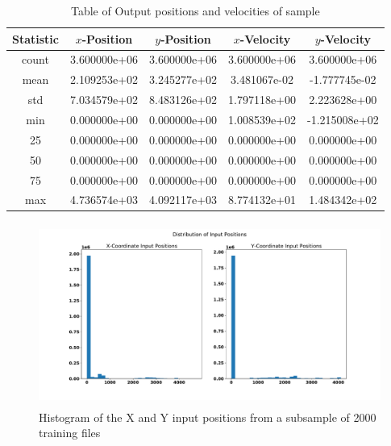 \documentclass{article}
\begin{document}
    \begin{table}[h!]
        \centering
        \begin{tabular}{|| c | c c c c||} 
        \hline
        Statistic & $x$-Position & $y$-Position & $x$-Velocity & $y$-Velocity\\ [0.5ex] 
        \hline\hline
        count & 3.600000e+06 & 3.600000e+06 & 3.600000e+06 & 3.600000e+06\\
        mean & 2.109253e+02 & 3.245277e+02 & 3.481067e-02 & -1.777745e-02\\
        std & 7.034579e+02 & 8.483126e+02 & 1.797118e+00 & 2.223628e+00\\
        min & 0.000000e+00 & 0.000000e+00  & 1.008539e+02 & -1.215008e+02\\
        25 & 	0.000000e+00 & 0.000000e+00 & 0.000000e+00 & 0.000000e+00\\
        50 & 	0.000000e+00 & 0.000000e+00 & 0.000000e+00 & 0.000000e+00\\
        75 & 	0.000000e+00 & 0.000000e+00 & 0.000000e+00 & 0.000000e+00\\
        max & 4.736574e+03 & 4.092117e+03 & 8.774132e+01 & 1.484342e+02\\
        \hline
        \end{tabular}
        \caption{Table of Output positions and velocities of sample}
        \label{table:2}
    \end{table}

    \begin{figure}[H]
        \centering
        \includegraphics[height=6cm]{figures/sample-in-position-hist.pdf}%
        \caption{Histogram of the X and Y input positions from a subsample of 2000 training files}%
        \label{fig:1}
    \end{figure}        
            
\end{document}
